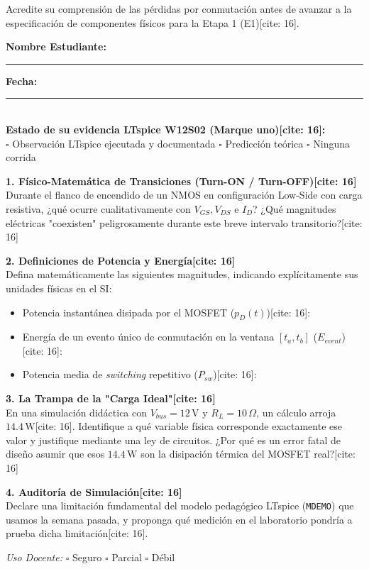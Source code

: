 \documentclass[11pt, a4paper]{article}
\begin{document}
\begin{tcolorbox}[colback=ucbblue!5, colframe=ucbblue, title=\textbf{Hoja Diagnóstica Individual (10 min) — Evidencia de Pérdidas}]
    Acredite su comprensión de las pérdidas por conmutación antes de avanzar a la especificación de componentes físicos para la Etapa 1 (E1)[cite: 16].
\end{tcolorbox}

\noindent\textbf{Nombre Estudiante:} \rule{7cm}{0.15mm} \hfill \textbf{Fecha:} \rule{3cm}{0.15mm} \\[0.3cm]
\textbf{Estado de su evidencia LTspice W12S02 (Marque uno)[cite: 16]:} \\
$\square$ Observación LTspice ejecutada y documentada \quad $\square$ Predicción teórica \quad $\square$ Ninguna corrida

\vspace{0.4cm}
\textbf{1. Físico-Matemática de Transiciones (Turn-ON / Turn-OFF)[cite: 16]} \\
Durante el flanco de encendido de un NMOS en configuración Low-Side con carga resistiva, ¿qué ocurre cualitativamente con $V_{GS}, V_{DS}$ e $I_D$? ¿Qué magnitudes eléctricas "coexisten" peligrosamente durante este breve intervalo transitorio?[cite: 16]
\vspace{2.5cm}

\textbf{2. Definiciones de Potencia y Energía[cite: 16]} \\
Defina matemáticamente las siguientes magnitudes, indicando explícitamente sus unidades físicas en el SI:
\begin{itemize}
    \item Potencia instantánea disipada por el MOSFET ($p_D(t)$)[cite: 16]: \hrulefill
    \item Energía de un evento único de conmutación en la ventana $[t_a, t_b]$ ($E_{event}$)[cite: 16]: \hrulefill
    \item Potencia media de \textit{switching} repetitivo ($P_{sw}$)[cite: 16]: \hrulefill
\end{itemize}

\vspace{0.2cm}
\textbf{3. La Trampa de la "Carga Ideal"[cite: 16]} \\
En una simulación didáctica con $V_{bus} = 12\,\text{V}$ y $R_L = 10\,\Omega$, un cálculo arroja $14.4\,\text{W}$[cite: 16]. 
Identifique a qué variable física corresponde exactamente ese valor y justifique mediante una ley de circuitos. ¿Por qué es un error fatal de diseño asumir que esos $14.4\,\text{W}$ son la disipación térmica del MOSFET real?[cite: 16]
\vspace{3cm}

\textbf{4. Auditoría de Simulación[cite: 16]} \\
Declare una limitación fundamental del modelo pedagógico LTspice (\texttt{MDEMO}) que usamos la semana pasada, y proponga qué medición en el laboratorio pondría a prueba dicha limitación[cite: 16].
\vspace{2.5cm}

\begin{flushright}
    \textit{Uso Docente:} \quad $\square$ Seguro \quad $\square$ Parcial \quad $\square$ Débil
\end{flushright}
\end{document}
